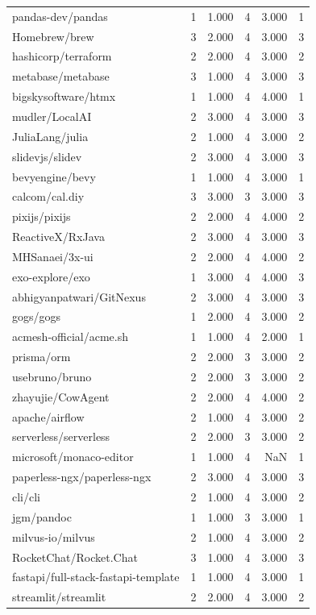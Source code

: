 \begin{tabular}{lrrrrr}
pandas-dev/pandas & 1 & 1.000 & 4 & 3.000 & 1 \\
Homebrew/brew & 3 & 2.000 & 4 & 3.000 & 3 \\
hashicorp/terraform & 2 & 2.000 & 4 & 3.000 & 2 \\
metabase/metabase & 3 & 1.000 & 4 & 3.000 & 3 \\
bigskysoftware/htmx & 1 & 1.000 & 4 & 4.000 & 1 \\
mudler/LocalAI & 2 & 3.000 & 4 & 3.000 & 3 \\
JuliaLang/julia & 2 & 1.000 & 4 & 3.000 & 2 \\
slidevjs/slidev & 2 & 3.000 & 4 & 3.000 & 3 \\
bevyengine/bevy & 1 & 1.000 & 4 & 3.000 & 1 \\
calcom/cal.diy & 3 & 3.000 & 3 & 3.000 & 3 \\
pixijs/pixijs & 2 & 2.000 & 4 & 4.000 & 2 \\
ReactiveX/RxJava & 2 & 3.000 & 4 & 3.000 & 3 \\
MHSanaei/3x-ui & 2 & 2.000 & 4 & 4.000 & 2 \\
exo-explore/exo & 1 & 3.000 & 4 & 4.000 & 3 \\
abhigyanpatwari/GitNexus & 2 & 3.000 & 4 & 3.000 & 3 \\
gogs/gogs & 1 & 2.000 & 4 & 3.000 & 2 \\
acmesh-official/acme.sh & 1 & 1.000 & 4 & 2.000 & 1 \\
prisma/orm & 2 & 2.000 & 3 & 3.000 & 2 \\
usebruno/bruno & 2 & 2.000 & 3 & 3.000 & 2 \\
zhayujie/CowAgent & 2 & 2.000 & 4 & 4.000 & 2 \\
apache/airflow & 2 & 1.000 & 4 & 3.000 & 2 \\
serverless/serverless & 2 & 2.000 & 3 & 3.000 & 2 \\
microsoft/monaco-editor & 1 & 1.000 & 4 & NaN & 1 \\
paperless-ngx/paperless-ngx & 2 & 3.000 & 4 & 3.000 & 3 \\
cli/cli & 2 & 1.000 & 4 & 3.000 & 2 \\
jgm/pandoc & 1 & 1.000 & 3 & 3.000 & 1 \\
milvus-io/milvus & 2 & 1.000 & 4 & 3.000 & 2 \\
RocketChat/Rocket.Chat & 3 & 1.000 & 4 & 3.000 & 3 \\
fastapi/full-stack-fastapi-template & 1 & 1.000 & 4 & 3.000 & 1 \\
streamlit/streamlit & 2 & 2.000 & 4 & 3.000 & 2 \\

\end{tabular}
